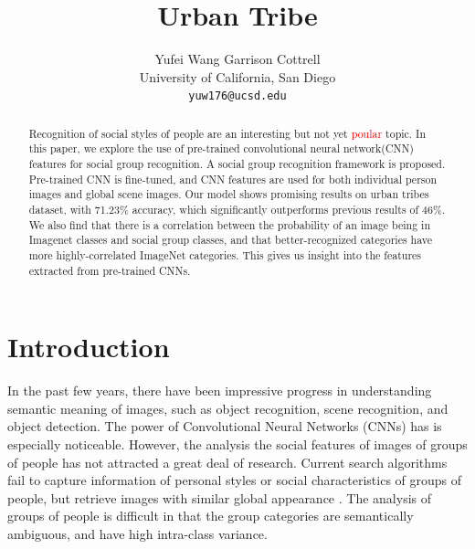 \documentclass[10pt,twocolumn,letterpaper]{article}
\begin{document}
\title{Urban Tribe}

\author{Yufei Wang \hspace{2cm}  Garrison Cottrell \\
University of California, San Diego\\
{\tt\small yuw176@ucsd.edu}
}

\maketitle
\ifwacvfinal\thispagestyle{empty}\fi

\begin{abstract}
Recognition of social styles of people are an interesting but not yet \textcolor{red} {poular} topic. In this paper, we explore the use of pre-trained convolutional neural network(CNN) features for social group recognition. A social group recognition framework is proposed. Pre-trained CNN is fine-tuned, and CNN features are used for both individual person images and global scene images. Our model shows promising results on urban tribes dataset, with 71.23\% accuracy, which significantly outperforms previous results of 46\%. We also find that there is a correlation between the probability of an image being in Imagenet classes and social group classes, and that better-recognized categories have more highly-correlated ImageNet categories. This gives us insight into the features extracted from pre-trained CNNs.

\end{abstract}

\section{Introduction}

In the past few years, there have been impressive progress in understanding semantic meaning of images, such as object recognition, scene recognition, and object detection. The power of Convolutional Neural Networks (CNNs) has is especially noticeable. However, the analysis the social features of images of groups of people has not attracted a great deal of research. Current search algorithms fail to capture information of personal styles or social characteristics of groups of people, but retrieve images with similar global appearance \cite{urbantribe2}. The analysis of groups of people is difficult in that the group categories are semantically ambiguous, and have high intra-class variance.
\end{document}
